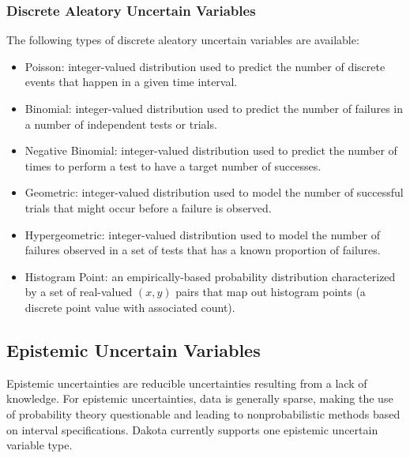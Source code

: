 \subsubsection{Discrete Aleatory Uncertain Variables}\label{variables:uncertain:dauv}

The following types of discrete aleatory uncertain variables are available:

\begin{itemize}

\item Poisson: integer-valued distribution used to predict the number of 
  discrete events that happen in a given time interval.

\item Binomial: integer-valued distribution used to predict 
  the number of failures in a number of independent tests or trials.

\item Negative Binomial: integer-valued distribution used to predict the
  number of times to perform a test to have a target number of successes.

\item Geometric: integer-valued distribution used to model the number of 
  successful trials that might occur before a failure is observed.

\item Hypergeometric: integer-valued distribution used to model the number 
  of failures observed in a set of tests that has a known proportion of 
  failures.

\item Histogram Point: an empirically-based probability distribution 
  characterized by a set of real-valued $(x,y)$ pairs that map out
  histogram points (a discrete point value with associated count).

\end{itemize}


\subsection{Epistemic Uncertain Variables}\label{variables:uncertain:euv}

Epistemic uncertainties are reducible uncertainties resulting from a
lack of knowledge.  For epistemic uncertainties, data is generally
sparse, making the use of probability theory questionable and leading
to nonprobabilistic methods based on interval specifications.  Dakota
currently supports one epistemic uncertain variable type.

